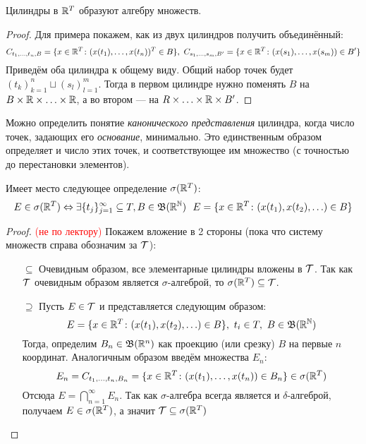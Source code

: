 \begin{proposition}
	Цилиндры в $\mathbb{R}^T$ образуют алгебру множеств.
\end{proposition}

\begin{proof}
	Для примера покажем, как из двух цилиндров получить объединённый:
	\[
		C_{t_1, \ldots, t_n, B} = \{x \in \mathbb{R}^T \colon (x(t_1), \ldots, x(t_n))^T \in B\},\ C_{s_1, \ldots, s_m, B'} = \{x \in \mathbb{R}^T \colon (x(s_1), \ldots, x(s_m)) \in B'\}
	\]
	Приведём оба цилиндра к общему виду. Общий набор точек будет $(t_k)_{k = 1}^n \sqcup (s_l)_{l = 1}^m$. Тогда в первом цилиндре нужно поменять $B$ на $B \times \mathbb{R} \times \ldots \times \mathbb{R}$, а во втором --- на $R \times \ldots \times \mathbb{R} \times B'$.
\end{proof}

\begin{note}
	Можно определить понятие \textit{канонического представления} цилиндра, когда число точек, задающих его \textit{основание}, минимально. Это единственным образом определяет и число этих точек, и соответствующее им множество (с точностью до перестановки элементов).
\end{note}

\begin{proposition}
	Имеет место следующее определение $\sigma(\mathbb{R}^T)$:
	\[
		E \in \sigma(\mathbb{R}^T) \Leftrightarrow \exists \{t_j\}_{j = 1}^\infty \subseteq T, B \in \mathfrak{B}(\mathbb{R}^{\mathbb{N}})\ \ E = \{x \in \mathbb{R}^T \colon (x(t_1), x(t_2), \ldots) \in B\}
	\]
\end{proposition}

\begin{proof} \textcolor{red}{(не по лектору)}
	Покажем вложение в 2 стороны (пока что систему множеств справа обозначим за $\mathcal{T}$):
	\begin{itemize}
		\item[$\subseteq$] Очевидным образом, все элементарные цилиндры вложены в $\mathcal{T}$. Так как $\mathcal{T}$ очевидным образом является $\sigma$-алгеброй, то $\sigma(\mathbb{R}^T) \subseteq \mathcal{T}$.
		
		\item[$\supseteq$] Пусть $E \in \mathcal{T}$ и представляется следующим образом:
		\[
			E = \{x \in \mathbb{R}^T \colon (x(t_1), x(t_2), \ldots) \in B\},\ t_i \in T,\ B \in \mathfrak{B}(\mathbb{R}^{\mathbb{N}})
		\]
		Тогда, определим $B_n \in \mathfrak{B}(\mathbb{R}^n)$ как проекцию (или срезку) $B$ на первые $n$ координат. Аналогичным образом введём множества $E_n$:
		\[
			E_n = C_{t_1, \ldots, t_n, B_n} = \{x \in \mathbb{R}^T \colon (x(t_1), \ldots, x(t_n)) \in B_n\} \in \sigma(\mathbb{R}^T)
		\]
		Отсюда $E = \bigcap_{n = 1}^\infty E_n$. Так как $\sigma$-алгебра всегда является и $\delta$-алгеброй, получаем $E \in \sigma(\mathbb{R}^T)$, а значит $\mathcal{T} \subseteq \sigma(\mathbb{R}^T)$
	\end{itemize}
\end{proof}

